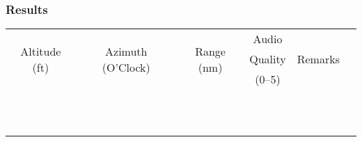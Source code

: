 % 
% 
%
\Large
\subsubsection*{Results}
  \settowidth{\colOne}{Altitude}
  \settowidth{\colTwo}{(O'Clock)}
  \settowidth{\colThree}{Range}
  \settowidth{\colSix}{Remarks}

  \begin{tabularx}{\textwidth}{|c|c|c|c|lX|}
    \hline
\multirow{3}{\colOne}{\centering Altitude (ft)}&\multirow{3}{\colTwo}{\centering Azimuth (O'Clock)}&\multirow{3}{\colThree}{\centering Range (nm)}&Audio&\multirow{3}{\colSix}{\centering Remarks}&\\
&&&Quality&&\\
&&&(0--5)&&\\
    \hline
    \hline
    &&&&&\\
    \hline
    &&&&&\\
    \hline
    &&&&&\\
    \hline
    &&&&&\\
    \hline
    &&&&&\\
    \hline
    &&&&&\\
    \hline
    &&&&&\\
    \hline
    &&&&&\\
    \hline
    &&&&&\\
    \hline
    &&&&&\\
    \hline
    &&&&&\\
    \hline
    \end{tabularx}     
    \normalsize

   